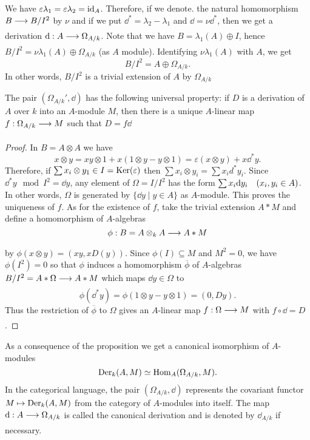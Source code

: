 \documentclass[../main]{subfiles}
\begin{document}
We have $\varepsilon \lambda_1=\varepsilon \lambda_2=\operatorname{id}_A$. Therefore, if we denote. the natural homomorphism $B \varrightarrow{} B / I^2$ by $\nu$ and if we put $\dd^\ast=\lambda_2-\lambda_1$ and $\dd=\nu \dd^*$, then we get a derivation $\dd: A \varrightarrow{} \Omega_{A / k}$. Note that we have $B=\lambda_1(A) \oplus I$, hence $B / I^2=\nu \lambda_1(A) \oplus \Omega_{A / k}$ (as $A$ module). Identifying $\nu \lambda_1(A)$ with $A$, we get
\[
B / I^2=A \oplus \Omega_{A/k}.
\]
In other words, $B / I^2$ is a trivial extension of $A$ by $\Omega_{A/k}$

\begin{proposition}\label{prop:26.01}
The pair $(\Omega_{A/k}', \dd)$ has the following universal property: if $D$ is a derivation of $A$ over $k$ into an $A$-module $M$, then there is a unique $A$-linear map $f: \Omega_{A / k} \varrightarrow{} M$ such that $D=f \dd$
\end{proposition}
\begin{proof}
In $B=A \otimes A$ we have \[x \otimes y=x y \otimes 1+x(1 \otimes y-y \otimes 1)=\varepsilon(x \otimes y)+x \dd^\ast y.\] Therefore, if $\sum x_i \otimes y_1 \in I=\operatorname{Ker}(\varepsilon)$ then $\sum x_i \otimes y_i=\sum x_i d^{\ast} y_i$. Since $\dd^\ast y \mod I^2=\dd y$, any element of $\Omega= I/ I^2$ has the form $\sum x_i \dd y_i\for{x_i, y_i\in A}$. In other words, $\Omega$ is generated by $\{\dd y \mid y \in A\}$ as $A$-module. This proves the uniqueness of $f$. As for the existence of $f$, take the trivial extension $A\ast M$ and define a homomorphism of $A$-algebras \[\phi: B=A \otimes_k A \varrightarrow{} A \ast M\] by $\phi(x \otimes y)=(x y, x D(y))$. Since $\phi(I) \subseteq M$ and $M^2=0$, we have $\phi(I^2)=0$ so that $\phi$ induces a homomorphism $\overline{\phi}$ of $A$-algebras $B / I^2=A * \Omega \varrightarrow{} A \ast M$ which maps $\dd y \in \Omega$ to \[\phi(\dd^* y)=\phi(1 \otimes y-y \otimes 1)=(0, D y).\] Thus the restriction of $\overline{\phi}$ to $\Omega$ gives an $A$-linear map \newline $f: \Omega \varrightarrow{} M$ with $f \circ \dd=D$.
\end{proof}

As a consequence of the proposition we get a canonical isomorphism of $A$-modules
\[
\operatorname{Der}_k(A, M) \simeq \operatorname{Hom}_A(\Omega_{A/k}, M) .
\]
In the categorical language, the pair $(\Omega_{A/k}, \dd)$ represents the covariant functor $M \mapsto \operatorname{Der}_k(A, M)$ from the category of $A$-modules into itself. The map \newline $\dd: A \varrightarrow{} \Omega_{A / k}$ is called the canonical derivation and is denoted by $\dd_{A / k}$ if necessary.
\end{document}
